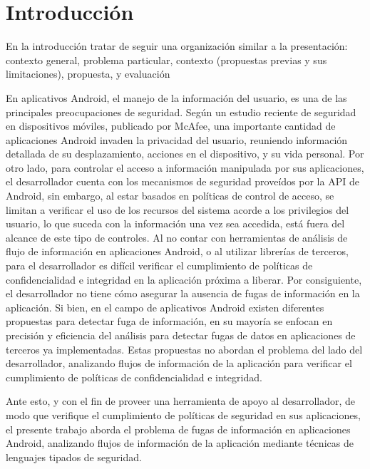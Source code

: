 \label{ch:introduccion}
\chapter{Introducción}
En la introducción tratar de seguir una organización similar a la presentación:
contexto general, problema particular, contexto (propuestas previas y sus
limitaciones), propuesta, y evaluación\newline

En aplicativos Android, el manejo de la información del usuario, es una de las
principales preocupaciones de seguridad. Según un estudio reciente de seguridad
en dispositivos móviles, publicado por McAfee\cite{McAfeeReport}, una importante
cantidad de aplicaciones Android invaden la privacidad del usuario, reuniendo
información detallada de su desplazamiento, acciones en el dispositivo, y su
vida personal.\newline 
Por otro lado, para controlar el acceso a información manipulada por sus
aplicaciones, el desarrollador cuenta con los mecanismos de seguridad proveídos
por la API de Android, sin embargo, al estar basados en políticas de control de
acceso, se limitan a verificar el uso de los recursos del sistema acorde a los
privilegios del usuario, lo que suceda con la información una vez sea accedida,
está fuera del alcance de este tipo de controles. Al no contar con herramientas
de análisis de flujo de información en aplicaciones Android, o al utilizar
librerías de terceros, para el desarrollador es difícil verificar
el cumplimiento de políticas de confidencialidad e integridad en la aplicación
próxima a liberar. Por consiguiente, el desarrollador no tiene cómo asegurar la
ausencia de fugas de información en la aplicación.\newline 
Si bien, en el campo de aplicativos Android existen diferentes propuestas para
detectar fuga de información, en su mayoría  se enfocan en precisión y
eficiencia del análisis para detectar fugas de datos en aplicaciones de terceros
ya implementadas. Estas propuestas
no abordan el problema del lado del desarrollador, analizando flujos de
información de la aplicación para verificar el cumplimiento de políticas de
confidencialidad e integridad.\newline

Ante esto, y con el fin de proveer una herramienta de apoyo al desarrollador, de
modo que verifique el cumplimiento de políticas de seguridad en sus
aplicaciones, el presente trabajo aborda el problema de fugas de información en
aplicaciones Android, analizando flujos de información de la aplicación mediante
técnicas de lenguajes tipados de seguridad.



